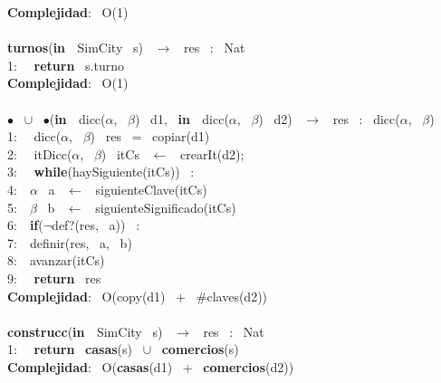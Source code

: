 \begin{Algoritmos}
\textbf{Complejidad}: \ O(1)\\
\noindent\makebox[\linewidth]{\rule{\textwidth}{0.4pt}}
\\
\noindent\makebox[\linewidth]{\rule{\textwidth}{0.4pt}}
\textbf{turnos}(\textbf{in \ }SimCity \ s) \ $\rightarrow $ \ res \ : \ Nat\\
1: \  \ \textbf{return} \ s.turno\\
\textbf{Complejidad}: \ O(1)\\
\noindent\makebox[\linewidth]{\rule{\textwidth}{0.4pt}}
\\
\noindent\makebox[\linewidth]{\rule{\textwidth}{0.4pt}}
$\bullet$ \ $\cup$ \ $\bullet$(\textbf{in \ }dicc($\alpha$, \ $\beta$) \ d1, \ \textbf{in \ }dicc($\alpha$, \ $\beta$) \ d2) \ $\rightarrow $ \ res \ : \ dicc($\alpha$, \ $\beta$)\\
1: \  \ dicc($\alpha$, \ $\beta$) \ res \ = \ copiar(d1)\\
2: \  \ itDicc($\alpha$, \ $\beta$) \ itCs \ $\leftarrow$ \ crearIt(d2);\\
3: \  \ \textbf{while}(haySiguiente(itCs)) \ :\\
4:\indent  \  \ $\alpha$ \ a \ $\leftarrow$ \ siguienteClave(itCs)\\
5:\indent  \  \ $\beta$ \ b \ $\leftarrow$ \ siguienteSignificado(itCs)\\
6:\indent  \  \ \textbf{if}($\neg$def?(res, \ a)) \ :\\
7:\indent \indent  \  \ definir(res, \ a, \ b)\\
8:\indent  \  \ avanzar(itCs)\\
9: \  \ \textbf{return} \ res\\
\textbf{Complejidad}: \ O(copy(d1) \ + \ $ \# $claves(d2))\\
\noindent\makebox[\linewidth]{\rule{\textwidth}{0.4pt}}
\\
\noindent\makebox[\linewidth]{\rule{\textwidth}{0.4pt}}
\textbf{construcc}(\textbf{in \ }SimCity \ s) \ $\rightarrow $ \ res \ : \ Nat\\
1: \  \ \textbf{return} \ \textbf{casas}(s) \ $\cup$ \ \textbf{comercios}(s)\\
\textbf{Complejidad}: \ O(\textbf{casas}(d1) \ + \ \textbf{comercios}(d2))\\
\noindent\makebox[\linewidth]{\rule{\textwidth}{0.4pt}}
\\
\\
\\
\end{Algoritmos}

